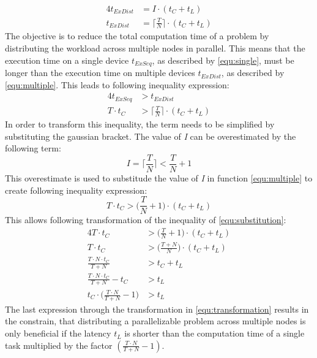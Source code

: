 \begin{alignat}{4}
  t_{ExDist} &= I \cdot (t_{C} + t_{L}) \nonumber \\
  t_{ExDist} &= \bigg\lceil\frac{T}{N}\bigg\rceil \cdot (t_{C} + t_{L})
  \label{equ:multiple}
\end{alignat}
The objective is to reduce the total computation time of a problem by distributing the workload across multiple nodes in parallel. This means that the execution time on a single device $t_{ExSeq}$, as described by \eqref{equ:single}, must be longer than the execution time on multiple devices $t_{ExDist}$, as described by \eqref{equ:multiple}. This leads to following inequality expression:
\begin{alignat}{4}
  t_{ExSeq} &> t_{ExDist} \nonumber \\
  T \cdot t_{C} &> \bigg\lceil\frac{T}{N}\bigg\rceil \cdot (t_{C} + t_{L})
  \label{equ:compare}
\end{alignat}
In order to transform this inequality, the term needs to be simplified by substituting the gaussian bracket. The value of \emph{I} can be overestimated by the following term:
\begin{equation}
  I = \bigg\lceil\frac{T}{N}\bigg\rceil < \frac{T}{N} + 1
  \label{equ:frac2}
\end{equation}
This overestimate is used to substitude the value of \emph{I} in function \ref{equ:multiple} to create following inequality expression:
\begin{equation}
  T \cdot t_{C} > \bigg(\frac{T}{N} + 1\bigg) \cdot (t_{C} + t_{L})
  \label{equ:substitution}
\end{equation}
This allows following transformation of the inequality of \ref{equ:substitution}:
\begin{alignat}{4}
 T \cdot t_{C} &> \bigg(\frac{T}{N} + 1\bigg) \cdot (t_{C} + t_{L}) \nonumber \\
 T \cdot t_{C} &> \bigg(\frac{T + N}{N}\bigg) \cdot (t_{C} + t_{L}) \nonumber \\
 \frac{T \cdot N \cdot t_{C}}{T + N} &> t_{C} + t_{L} \nonumber \\
 \frac{T \cdot N \cdot t_{C}}{T + N} - t_{C} &> t_{L} \nonumber \\
 t_{C} \cdot \bigg(\frac{T \cdot N}{T + N} - 1\bigg) &> t_{L}
 \label{equ:transformation}
\end{alignat}
The last expression through the transformation in \eqref{equ:transformation} results in the constrain, that distributing a parallelizable problem across multiple nodes is only beneficial if the latency $t_{L}$ is shorter than the computation time of a single task multiplied by the factor $(\frac{T \cdot N}{T + N} - 1)$.

